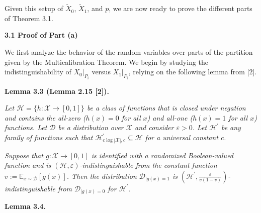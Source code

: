 \documentclass[10pt,a4paper]{article}
\begin{document}



Given this setup of $\widetilde{X}_{0}$, $\widetilde{X}_{1}$, and $p$, we are now ready to prove the different parts of Theorem 3.1.\par





\par\medskip\noindent\textbf{
3.1 Proof of Part (a)}\par




We first analyze the behavior of the random variables over parts of the partition given by the Multicalibration Theorem. We begin by studying the indistinguishability of $X_{0}|_{P_{i}}$ versus $X_{1}|_{P_{i}}$, relying on the following lemma from [2].\par





\par\medskip\noindent\textbf{
\textbf{Lemma 3.3}\textbf{ }(Lemma 2.15 [2])\textbf{.}
}\par



\emph{Let $\mathcal{H}=\{h:\mathcal{X}\to[0,1]\}$ be a class of functions that is closed under negation and contains the all-zero ($h(x)=0$ for all $x$) and all-one ($h(x)=1$ for all $x$) functions. Let $\mathcal{D}$ be a distribution over $\mathcal{X}$ and consider $\varepsilon>0$. Let $\mathcal{H}^{\prime}$ be any family of functions such that $\mathcal{H}^{\prime}_{c\log|\mathcal{X}|,c}\subseteq\mathcal{H}$ for a universal constant $c$.}\par




\emph{Suppose that $g:\mathcal{X}\to[0,1]$ is identified with a randomized Boolean-valued function and is $(\mathcal{H},\varepsilon)$-indistinguishable from the constant function $v:=\mathbb{E}_{x\sim\mathcal{D}}[g(x)]$. Then the distribution $\mathcal{D}_{|g(x)=1}$ is $\left(\mathcal{H}^{\prime},\frac{\varepsilon}{v(1-v)}\right)$-indistinguishable from $\mathcal{D}_{|g(x)=0}$ for $\mathcal{H}^{\prime}$.}\par







\par\medskip\noindent\textbf{
\textbf{Lemma 3.4}\textbf{.}
}\par
\end{document}
